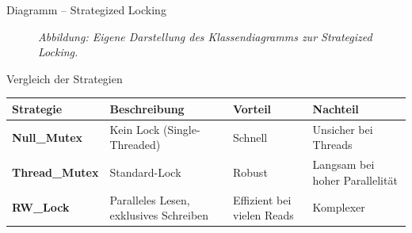 \documentclass[aspectratio=169,10pt]{beamer}
\begin{document}
\begin{frame}{Diagramm -- Strategized Locking}
  \begin{center}
     \begin{figure}
      \centering

      \vspace{0.6em}
      {\footnotesize\itshape Abbildung: Eigene Darstellung des Klassendiagramms zur Strategized Locking.}

      \vspace{0.4em}
      {\raggedleft\scriptsize\textcolor{hsaaGray}{}}
     \end{figure}
  \end{center}
\end{frame}

\begin{frame}{Vergleich der Strategien}
  \centering
  {\small
  \setlength{\tabcolsep}{6pt}
  \renewcommand{\arraystretch}{1.25}
  \begin{tabularx}{0.92\linewidth}{>{\bfseries}lYYY}
    \toprule
    Strategie & Beschreibung & Vorteil & Nachteil \\
    \midrule
    Null\_Mutex & Kein Lock (Single-Threaded) & Schnell & Unsicher bei Threads \\
    Thread\_Mutex & Standard-Lock & Robust & Langsam bei hoher Parallelit\"at \\
    RW\_Lock & Paralleles Lesen, exklusives Schreiben & Effizient bei vielen Reads & Komplexer \\
    \bottomrule
  \end{tabularx}
  }
\end{frame}
\end{document}
